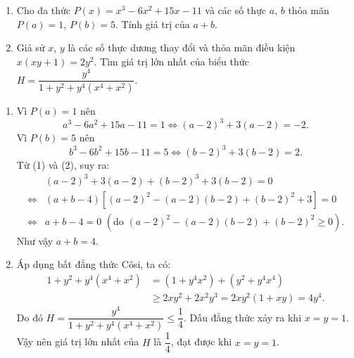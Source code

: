 \begin{ex}%
 \hfill
    \begin{enumerate}
        \item Cho đa thức $P(x)=x^{3}-6{x}^{2}+15x-11$ và các số thực $a$, $b$ thỏa mãn $P(a)=1$, $P(b)=5$. Tính giá trị của $a+b$.
        \item  Giả sử $x$, $y$ là các số thực dương thay đổi và thỏa mãn điều kiện $x(xy+1)=2{y}^{2}$.  Tìm giá trị lớn nhất của biểu thức $H=\dfrac{{y}^{4}}{1+{y^{2}}+{y}^{4}\left( {x}^{4}+{x}^{2} \right)}$.
    \end{enumerate}
\loigiai
    {
    \begin{enumerate}
        \item Vì  $P(a)=1$ nên 
        \[{a}^{3}-6{a}^{2}+15a-11=1\Leftrightarrow \left( a-2 \right)^{3}+3(a-2)=-2.\tag{1}\]
       Vì  $P(b)=5$ nên 
       \[{b}^{3}-6{b}^{2}+15b-11=5\Leftrightarrow \left( b-2 \right)^{3}+3(b-2)=2.\tag{2}\]
        Từ (1) và (2), suy ra:
        {\allowdisplaybreaks
       \begin{align*}
        & \left( a-2 \right)^{3}+3(a-2)+\left( b-2 \right)^{3}+3(b-2)=0 \\ 
         \Leftrightarrow& \left( a+b-4 \right)\left[ \left( a-2 \right)^{2}-\left( a-2 \right)\left( b-2 \right)+\left( b-2 \right)^{2}+3 \right]=0\\ 
        \Leftrightarrow& a+b-4=0 \,\, (\text{do}\,\,       
        \left( a-2 \right)^{2}-\left( a-2 \right)\left( b-2 \right)+\left( b-2 \right)^{2}\ge 0).
        \end{align*}}Như vậy $a+b=4$.
       \item Áp dụng bất đẳng thức Côsi, ta có:
       {\allowdisplaybreaks
       \begin{align*}
       1+{y}^{2}+{y}^{4}\left( {x}^{4}+ {x}^{2} \right)&=\left( 1+{y}^{4}{x}^{2} \right)+\left( {y}^{2}+{y}^{4}{x}^{4} \right) \\ 
       & \ge 2x{y}^{2}+2{x}^{2}{y}^{3}=2x{y}^{2}\left( 1+xy \right)=4{y}^{4}.
       \end{align*}}Do đó $H=\dfrac{{y}^{4}}{1+{y}^{2}+{y}^{4}\left( {x}^{4}+{x}^{2} \right)}\le \dfrac{1}{4}$.
       Dấu đẳng thức xảy ra khi
       $x=y=1$. Vậy  nên giá trị lớn nhất của $H$ là $\dfrac{1}{4}$, đạt được khi $x=y=1$.
    \end{enumerate}
    }
\end{ex}

